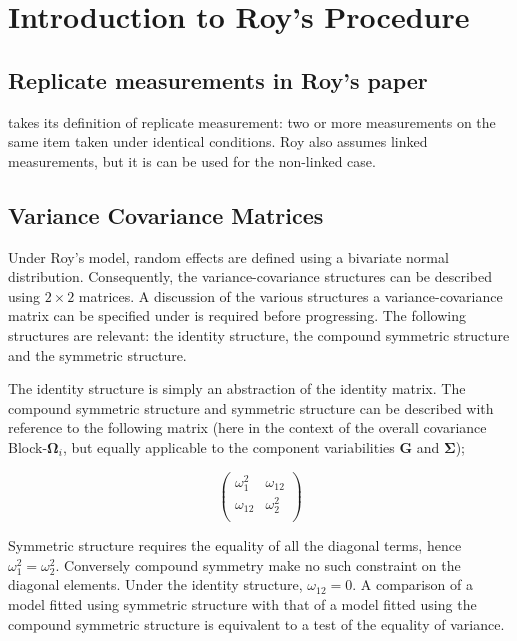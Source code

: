 \documentclass[12pt, a4paper]{report}
\theoremstyle{plain}
\theoremstyle{definition}
\theoremstyle{remark}
\begin{document}
\chapter{Introduction to Roy's Procedure}

\section{Replicate measurements in Roy's paper}
\citet{ARoy2009} takes its definition of replicate measurement: two or more measurements on the same item taken
under identical conditions. Roy also assumes linked measurements, but it is can be used for the non-linked case.


\section{Variance Covariance Matrices }

Under Roy's model, random effects are defined using a bivariate normal distribution. Consequently, the variance-covariance structures can be described using $2 \times 2$  matrices. A discussion of the various structures a variance-covariance matrix can be specified under is required before progressing. The following structures are relevant: the identity structure, the compound symmetric structure and the symmetric structure.

The identity structure is simply an abstraction of the identity matrix. The compound symmetric structure and symmetric structure can be described with reference to the following matrix (here in the context of the overall covariance Block-$\boldsymbol{\Omega}_i$, but equally applicable to the component variabilities $\boldsymbol{G}$ and $\boldsymbol{\Sigma}$);

\[\left( \begin{array}{cc}
\omega^2_1  & \omega_{12} \\
\omega_{12} & \omega^2_2 \\
\end{array}\right) \]

Symmetric structure requires the equality of all the diagonal terms, hence $\omega^2_1 = \omega^2_2$. Conversely compound symmetry make no such constraint on the diagonal elements. Under the identity structure, $\omega_{12} = 0$.
A comparison of a model fitted using symmetric structure with that of a model fitted using the compound symmetric structure is equivalent to a test of the equality of variance.


\end{document}
